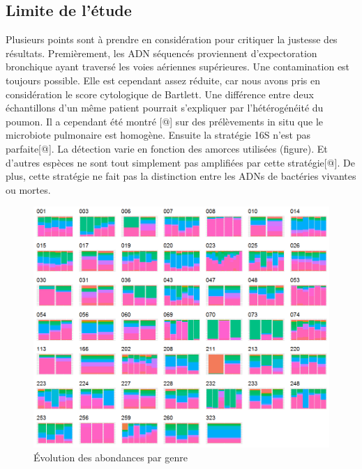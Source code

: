 \documentclass[12pt,a4paper]{article}
\begin{document}
\subsection{Limite de l'étude}
Plusieurs points sont à prendre en considération pour critiquer la justesse des résultats. Premièrement, les ADN séquencés proviennent d'expectoration bronchique ayant traversé les voies aériennes supérieures. Une contamination est toujours possible. Elle est cependant assez réduite, car nous avons pris en considération le score cytologique de Bartlett.  
Une différence entre deux échantillons d'un même patient pourrait s'expliquer par l'hétérogénéité du poumon. Il a cependant été montré [@] sur des prélèvements in situ que le microbiote pulmonaire est homogène.  
Ensuite la stratégie 16S n'est pas parfaite[@]. La détection varie en fonction des amorces utilisées (figure). Et d'autres espèces ne sont tout simplement pas amplifiées par cette stratégie[@]. De plus, cette stratégie ne fait pas la distinction entre les ADNs de bactéries vivantes ou mortes.  
\begin{figure}
\begin{center}
\includegraphics[scale=0.70]{img/enfin_barplot_genus_norm.png}\hfill
\end{center}
\caption{Évolution des abondances par genre}
\label{plotabundancegenre}
\end{figure}
\end{document}
